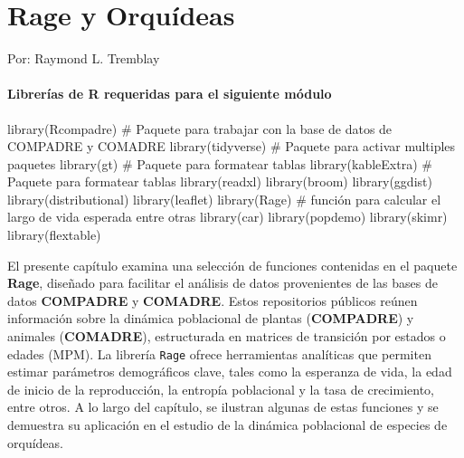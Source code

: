 \documentclass[
  12pt,
  letterpaper,
]{book}
\author{}
\date{}
\newenvironment{Shaded}{\begin{snugshade}}{\end{snugshade}}
\newcommand{\CommentTok}[1]{\textcolor[rgb]{0.37,0.37,0.37}{#1}}
\newcommand{\FunctionTok}[1]{\textcolor[rgb]{0.28,0.35,0.67}{#1}}
\newcommand{\NormalTok}[1]{\textcolor[rgb]{0.00,0.23,0.31}{#1}}
\renewcommand*\contentsname{Table of contents}
\newcommand\contentsname{Table of contents}
\begin{document}
\frontmatter

\renewcommand*\contentsname{Table of contents}
{
\hypersetup{linkcolor=}
\setcounter{tocdepth}{2}
\tableofcontents
}

\mainmatter
\chapter{Rage y Orquídeas}\label{Rage}

Por: Raymond L. Tremblay

\subsubsection{Librerías de R requeridas para el siguiente
módulo}\label{libreruxedas-de-r-requeridas-para-el-siguiente-muxf3dulo}

\begin{Shaded}
\begin{Highlighting}[]
\FunctionTok{library}\NormalTok{(Rcompadre) }\CommentTok{\# Paquete para trabajar con la base de datos de COMPADRE y COMADRE}
\FunctionTok{library}\NormalTok{(tidyverse) }\CommentTok{\# Paquete para activar multiples paquetes}
\FunctionTok{library}\NormalTok{(gt) }\CommentTok{\# Paquete para formatear tablas}
\FunctionTok{library}\NormalTok{(kableExtra) }\CommentTok{\# Paquete para formatear tablas}
\FunctionTok{library}\NormalTok{(readxl)}
\FunctionTok{library}\NormalTok{(broom)}
\FunctionTok{library}\NormalTok{(ggdist)}
\FunctionTok{library}\NormalTok{(distributional)}
\FunctionTok{library}\NormalTok{(leaflet)}
\FunctionTok{library}\NormalTok{(Rage) }\CommentTok{\# función para calcular el largo de vida esperada entre otras}
\FunctionTok{library}\NormalTok{(car)}
\FunctionTok{library}\NormalTok{(popdemo)}
\FunctionTok{library}\NormalTok{(skimr)}
\FunctionTok{library}\NormalTok{(flextable)}
\end{Highlighting}
\end{Shaded}

El presente capítulo examina una selección de funciones contenidas en el
paquete \textbf{Rage}, diseñado para facilitar el análisis de datos
provenientes de las bases de datos \textbf{COMPADRE} y \textbf{COMADRE}.
Estos repositorios públicos reúnen información sobre la dinámica
poblacional de plantas (\textbf{COMPADRE}) y animales
(\textbf{COMADRE}), estructurada en matrices de transición por estados o
edades (MPM). La librería \texttt{Rage} ofrece herramientas analíticas
que permiten estimar parámetros demográficos clave, tales como la
esperanza de vida, la edad de inicio de la reproducción, la entropía
poblacional y la tasa de crecimiento, entre otros. A lo largo del
capítulo, se ilustran algunas de estas funciones y se demuestra su
aplicación en el estudio de la dinámica poblacional de especies de
orquídeas.
\end{document}

